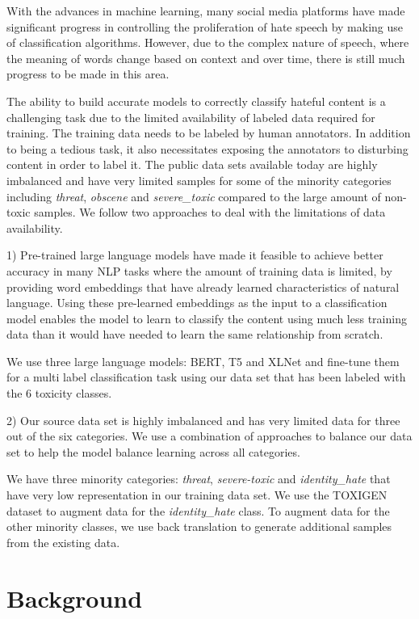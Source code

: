 \documentclass[11pt,a4paper]{article}
\begin{document}
With the advances in machine learning, many social media platforms have made significant progress in controlling the proliferation of hate speech by making use of classification algorithms.  However, due to the complex nature of speech, where the meaning of words change based on context and over time, there is still much progress to be made in this area.

The ability to build accurate models to correctly classify hateful content is a challenging task due to the limited availability of labeled data required for training. The training data needs to be labeled by human annotators. In addition to being a tedious task, it also necessitates exposing the annotators to  disturbing content in order to label it. The public data sets available today are highly imbalanced and have very limited samples for some of the minority categories including \emph{threat}, \emph{obscene} and \emph{severe\_toxic} compared to the large amount of non-toxic samples. We follow two approaches to deal with the limitations of data availability.

1) Pre-trained large language models have made it feasible to achieve better accuracy  in many NLP tasks where the amount of training data is limited, by providing word embeddings that have already learned characteristics of natural language. Using these pre-learned embeddings as the input to a classification model enables the model to learn to classify the content using much less training data than it would have needed to learn the same relationship from scratch.

We use three large language models: BERT, T5 and XLNet and fine-tune them for a multi label classification task using our data set that has been labeled with the 6 toxicity classes. 

2) Our source data set is highly imbalanced and has very limited data for three out of the six categories. We use a combination of approaches to balance our data set to help the model balance learning across all categories.

We have three minority categories: \emph{threat}, \emph{severe-toxic} and \emph{identity\_hate} that have very low representation in our training data set. We use the TOXIGEN \cite{hartvigsen2022toxigen} dataset to augment data for the \emph{identity\_hate} class. To augment data for the other minority classes, we use back translation to generate additional samples from the existing data. 


\section{Background}
\end{document}
